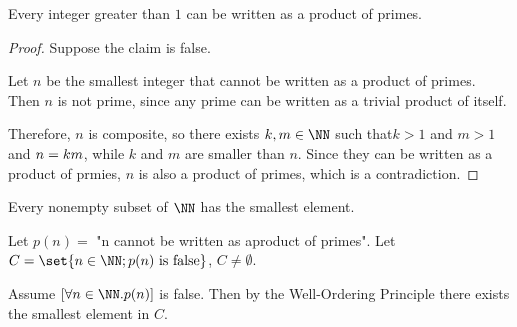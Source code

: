 \documentclass[11pt]{scrartcl}
\begin{document}
\begin{theorem}\hfill
  
  Every integer greater than $1$ can be written as a product of primes.
\end{theorem}

\begin{proof}
  \hfill

  Suppose the claim is false.

  Let $n$ be the smallest integer that cannot be written as a product
  of primes. Then $n$ is not prime, since any prime can be written as
  a trivial product of itself.

  Therefore, $n$ is composite, so there exists $k, m \in\NN$ such
  that$k > 1$ and $m>1$ and $n = k\*m$, while $k$ and $m$ are smaller
  than $n$. Since they can be written as a product of prmies, $n$ is
  also a product of primes, which is a contradiction.
\end{proof}

\begin{definition}
  Every nonempty subset of $\NN$ has the smallest element.
\end{definition}

\begin{example}

  Let $p(n) =$ "n cannot be written as aproduct of primes". Let
  $C = \set{n\in\NN; p(n) \text{ is false}}$, $C\neq \emptyset$.

  Assume $[\forall n\in \NN.p(n)]$ is false. Then by the Well-Ordering Principle there exists the smallest element in $C$.

\end{example}
\end{document}
